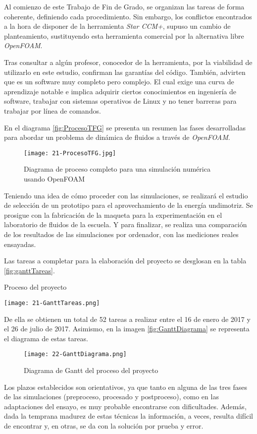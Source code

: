 Al comienzo de este Trabajo de Fin de Grado, se organizan las tareas de
forma coherente, definiendo cada procedimiento. Sin embargo, los
conflictos encontrados a la hora de disponer de la herramienta
\emph{Star CCM+}, supuso un cambio de planteamiento, sustituyendo esta
herramienta comercial por la alternativa libre \emph{OpenFOAM}.

Tras consultar a algún profesor, conocedor de la herramienta, por la
viabilidad de utilizarlo en este estudio, confirman las garantías del
código. También, advirten que es un software muy completo pero complejo.
El cual exige una curva de aprendizaje notable e implica adquirir
ciertos conocimientos en ingeniería de software, trabajar con sistemas
operativos de Linux y no tener barreras para trabajar por línea de
comandos.

En el diagrama \autoref{fig:ProcesoTFG} se presenta un resumen las fases
desarrolladas para abordar un problema de dinámica de fluidos a través
de \emph{OpenFOAM}.

\begin{figure}
\centering
\texttt{[image: 21-ProcesoTFG.jpg]}
\caption[Diagrama de proceso]{Diagrama de proceso completo para una simulación
numérica usando OpenFOAM}
\label{fig:ProcesoTFG}
\end{figure}

Teniendo una idea de cómo proceder con las simulaciones, se realizará el
estudio de selección de un prototipo para el aprovechamiento de la
energía undimotriz. Se prosigue con la fabricación de la maqueta para la
experimentación en el laboratorio de fluidos de la escuela. Y para
finalizar, se realiza una comparación de los resultados de las
simulaciones por ordenador, con las mediciones reales ensayadas.

Las tareas a completar para la elaboración del proyecto se desglosan en la tabla \autoref{fig:ganttTareas}.

\begin{table}
\centering
\caption{Proceso del proyecto}
\texttt{[image: 21-GanttTareas.png]}
\label{fig:ganttTareas}
\end{table}

De ella se obtienen un total de 52 tareas a realizar entre
el 16 de enero de 2017 y el 26 de julio de 2017. Asimismo, en la
imagen \autoref{fig:GanttDiagrama} se representa el diagrama de estas tareas.

\begin{figure}
\centering
\texttt{[image: 22-GanttDiagrama.png]}
\caption{Diagrama de Gantt del proceso del proyecto}
\label{fig:GanttDiagrama}
\end{figure}

Los plazos establecidos son orientativos, ya que tanto en alguna de las
tres fases de las simulaciones (preproceso, procesado y postproceso),
como en las adaptaciones del ensayo, es muy probable encontrarse con
dificultades. Además, dada la temprana madurez de estas técnicas la
información, a veces, resulta difícil de encontrar y, en otras, se da
con la solución por prueba y error.
